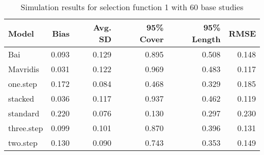 \documentclass[12pt]{article}   	%
\numberwithin{equation}{section}
\begin{document}
\begin{table}[ht]
\centering
\begin{tabular}{lrrrrr}
  \hline
Model & Bias & Avg. SD & 95\% Cover & 95\% Length & RMSE \\ 
  \hline
Bai & 0.093 & 0.129 & 0.895 & 0.508 & 0.148 \\ 
  Mavridis & 0.031 & 0.122 & 0.969 & 0.483 & 0.117 \\ 
  one.step & 0.172 & 0.084 & 0.468 & 0.329 & 0.185 \\ 
  stacked & 0.036 & 0.117 & 0.937 & 0.462 & 0.119 \\ 
  standard & 0.220 & 0.076 & 0.130 & 0.297 & 0.230 \\ 
  three.step & 0.099 & 0.101 & 0.870 & 0.396 & 0.131 \\ 
  two.step & 0.130 & 0.090 & 0.743 & 0.353 & 0.149 \\ 
   \hline
\end{tabular}
\caption{Simulation results for selection function 1 with 60 base studies}
\end{table}





\end{document}

